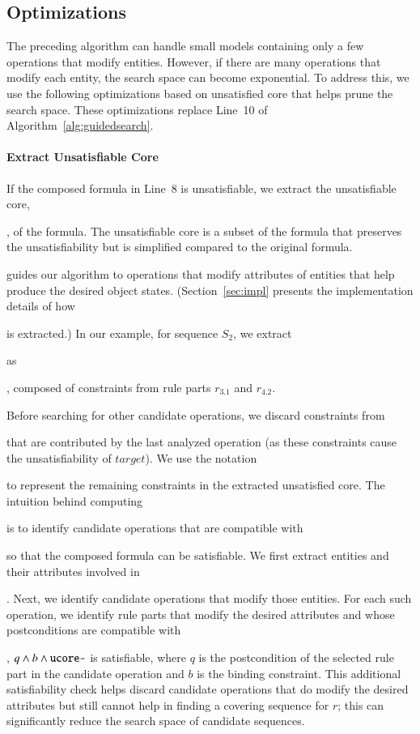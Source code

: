\subsection{Optimizations}
\label{sec:optimization}

The preceding algorithm can handle small models containing only a few operations
that modify entities. However, if there are many operations that modify each
entity, the search space can become exponential. To address this, we use the
following optimizations based on unsatisfied core that helps prune the search
space. These optimizations replace Line~10 of Algorithm~\ref{alg:guidedsearch}.

\paragraph*{Extract Unsatisfiable Core} If the composed formula in
Line~8 is unsatisfiable, we extract the unsatisfiable core, \subject{ucore}, of
the formula. The unsatisfiable core is a subset of the formula that preserves
the unsatisfiability but is simplified compared to the original formula.
\subject{ucore} guides our algorithm to operations that modify attributes of
entities that help produce the desired object states. (Section~\ref{sec:impl}
presents the implementation details of how \subject{ucore} is extracted.) In our
example, for sequence $S_2$, we extract \subject{ucore} as \subject{ord.total =
  0 $\wedge$ ord.total > 0}, composed of constraints from rule parts $r_{3.1}$
and $r_{4.2}$.

Before searching for other candidate operations, we discard constraints from
\subject{ucore} that are contributed by the last analyzed operation (as these
constraints cause the unsatisfiability of $target$).  We use the notation
\subject{ucore-} to represent the remaining constraints in the extracted
unsatisfied core. The intuition behind computing \subject{ucore-} is to identify
candidate operations that are compatible with \subject{ucore-} so that the
composed formula can be satisfiable. We first extract entities and their
attributes involved in \subject{ucore-}. Next, we identify candidate operations
that modify those entities.  For each such operation, we identify rule parts
that modify the desired attributes and whose postconditions are compatible with
\subject{ucore-}, \ie{} $q \wedge b \wedge \subject{ucore-}$ is satisfiable,
where $q$ is the postcondition of the selected rule part in the candidate
operation and $b$ is the binding constraint.  This additional satisfiability
check helps discard candidate operations that do modify the desired attributes
but still cannot help in finding a covering sequence for $r$; this can
significantly reduce the search space of candidate sequences.

